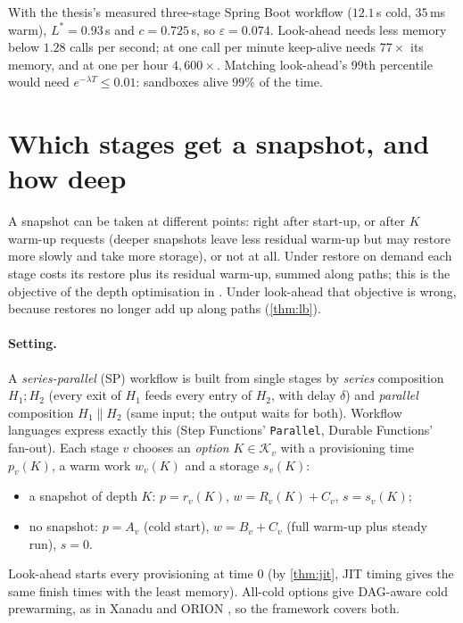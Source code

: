 With the thesis's measured three-stage Spring Boot workflow ($12.1$\,s cold, $35$\,ms warm),
$L^* = 0.93$\,s and $c = 0.725$\,s, so $\varepsilon = 0.074$. Look-ahead needs less memory below
$1.28$ calls per second; at one call per minute keep-alive needs $77\times$ its memory, and at one
per hour $4{,}600\times$. Matching look-ahead's 99th percentile would need $e^{-\lambda T} \le
0.01$: sandboxes alive $99\%$ of the time.

\section{Which stages get a snapshot, and how deep}
\label{sec:th-depth}

A snapshot can be taken at different points: right after start-up, or after $K$ warm-up
requests (deeper snapshots leave less residual warm-up but may restore more slowly and take
more storage), or not at all. Under restore on demand each stage costs its restore plus its
residual warm-up, summed along paths; this is the objective of the depth optimisation in
. Under look-ahead that objective is wrong, because restores no longer add up
along paths (\cref{thm:lb}).

\paragraph{Setting.} A \emph{series-parallel} (SP) workflow is built from single stages by
\emph{series} composition $H_1 ; H_2$ (every exit of $H_1$ feeds every entry of $H_2$, with
delay $\delta$) and \emph{parallel} composition $H_1 \parallel H_2$ (same input; the output
waits for both). Workflow languages express exactly this (Step Functions' \texttt{Parallel},
Durable Functions' fan-out). Each stage $v$ chooses an \emph{option} $K \in \mathcal{K}_v$ with
a provisioning time $p_v(K)$, a warm work $w_v(K)$ and a storage $s_v(K)$:
\begin{itemize}
  \item a snapshot of depth $K$: $p = r_v(K)$, $w = R_v(K) + C_v$, $s = s_v(K)$;
  \item no snapshot: $p = A_v$ (cold start), $w = B_v + C_v$ (full warm-up plus steady run),
        $s = 0$.
\end{itemize}
Look-ahead starts every provisioning at time $0$ (by \cref{thm:jit}, JIT timing gives the same
finish times with the least memory). All-cold options give DAG-aware cold prewarming, as in
Xanadu and ORION \cite{xanadu2020,orion2022}, so the framework covers both.

